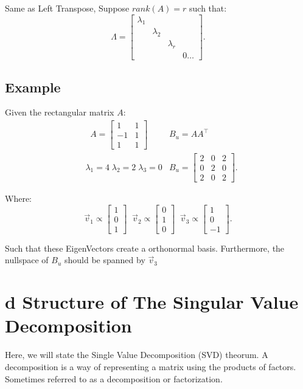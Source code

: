 \documentclass[12pt]{book}
\begin{document}
Same as Left Transpose, Suppose $rank(A)=r$ such that:
\[
\Lambda =        \begin{bmatrix} \lambda_1  & & & \\ & \lambda_2 & & \\ & & \lambda_r & \\ & & & 0\ldots \end{bmatrix} 
.\] 

\subsection*{Example}
Given the rectangular matrix $A$:
 \begin{align*}
         &\;\;A = \begin{bmatrix} 1 & 1 \\ -1 & 1\\ 1 & 1 \end{bmatrix} &B_u = A A^\top\\
         &\lambda_1 = 4\;\lambda_2 = 2\;\lambda_3 = 0& B_u = \begin{bmatrix} 2 & 0 & 2 \\ 0 & 2 & 0 \\ 2 & 0 & 2 \end{bmatrix} 
.\end{align*}

Where:
\[
\vec v_1 \propto \begin{bmatrix} 1\\0\\1 \end{bmatrix}\;\;\vec v_2 \propto \begin{bmatrix} 0\\1\\0 \end{bmatrix}
\;\; \vec v_3 \propto \begin{bmatrix} 1\\0\\-1 \end{bmatrix} 
.\] 

Such that these EigenVectors create a orthonormal basis. Furthermore, the nullspace of $B_u$ should be spanned by  $\vec v_3$
\section*{d Structure of The Singular Value Decomposition}
Here, we will state the Single Value Decomposition (SVD) theorum.
A decomposition is a way of representing a matrix using the products of factors.
Sometimes referred to as a decomposition or factorization.
\end{document}
